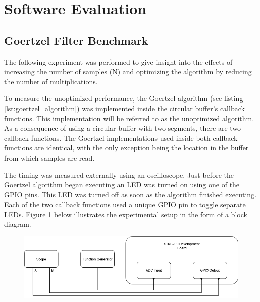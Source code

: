 
\section{Software Evaluation}






\subsection{Goertzel Filter Benchmark}
The following experiment was performed to give insight into the effects of increasing the number of samples (N) and optimizing the algorithm by reducing the number of multiplications. %

To measure the unoptimized performance, the Goertzel algorithm (see listing \ref{lst:goertzel_algorithm}) was implemented inside the circular buffer's callback functions. This implementation will be referred to as the unoptimized algorithm. As a consequence of using a circular buffer with two segments, there are two callback functions. The Goertzel implementations used inside both callback functions are identical, with the only exception being the location in the buffer from which samples are read.

The timing was measured externally using an oscilloscope. Just before the Goertzel algorithm began executing an LED was turned on using one of the GPIO pins. This LED was turned off as soon as the algorithm finished executing. Each of the two callback functions used a unique GPIO pin to toggle separate LEDs. Figure \ref{fig:goertzel_optimization_experiemnt} below illustrates the experimental setup in the form of a block diagram.

\begin{figure}[H]
	\centering
	\includegraphics[width=.9\linewidth]{figures/experimentation/goertzel_speed_test_diagram.png}
	\label{fig:goertzel_optimization_experiemnt}
\end{figure}

